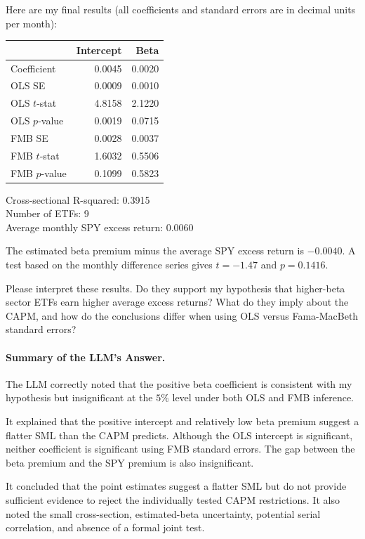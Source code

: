 Here are my final results (all coefficients and standard errors are in decimal
units per month):

\begin{center}
\small
\begin{tabular}{lrr}
\toprule
& Intercept & Beta \\
\midrule
Coefficient & 0.0045 & 0.0020 \\
OLS SE & 0.0009 & 0.0010 \\
OLS $t$-stat & 4.8158 & 2.1220 \\
OLS $p$-value & 0.0019 & 0.0715 \\
FMB SE & 0.0028 & 0.0037 \\
FMB $t$-stat & 1.6032 & 0.5506 \\
FMB $p$-value & 0.1099 & 0.5823 \\
\bottomrule
\end{tabular}
\end{center}

\noindent Cross-sectional R-squared: 0.3915\\
Number of ETFs: 9\\
Average monthly SPY excess return: 0.0060

The estimated beta premium minus the average SPY excess return is $-0.0040$. A
test based on the monthly difference series gives $t = -1.47$ and
$p = 0.1416$.

Please interpret these results. Do they support my hypothesis that higher-beta
sector ETFs earn higher average excess returns? What do they imply about the
CAPM, and how do the conclusions differ when using OLS versus Fama-MacBeth
standard errors?

\paragraph{Summary of the LLM's Answer.} The LLM correctly noted that the
positive beta coefficient is consistent with my hypothesis but insignificant at
the $5\%$ level under both OLS and FMB inference.

It explained that the positive intercept and relatively low beta premium
suggest a flatter SML than the CAPM predicts. Although the OLS intercept is
significant, neither coefficient is significant using FMB standard errors. The
gap between the beta premium and the SPY premium is also insignificant.

It concluded that the point estimates suggest a flatter SML but do not provide
sufficient evidence to reject the individually tested CAPM restrictions. It
also noted the small cross-section, estimated-beta uncertainty, potential
serial correlation, and absence of a formal joint test.

